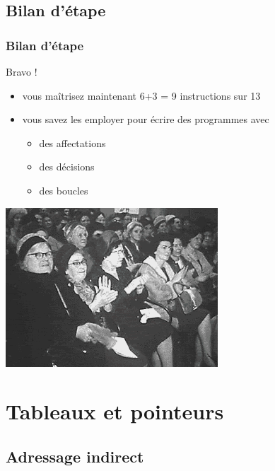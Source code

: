 \subsection{Bilan d'étape}
\begin{frame}
\frametitle{Bilan d'étape}
\begin{multicols}{2}
\alert{Bravo !}
\begin{itemize}
\item vous maîtrisez maintenant 6+3 = 9 instructions sur 13
\item vous savez les employer pour écrire des programmes avec  
  \begin{itemize}
\item des affectations
 \item des décisions
\item des boucles
  \end{itemize}
\end{itemize}

\includegraphics[width=\linewidth]{images/anim/congrats-0}

\end{multicols}
\end{frame}

\section{Tableaux et pointeurs}

\subsection{Adressage indirect}

